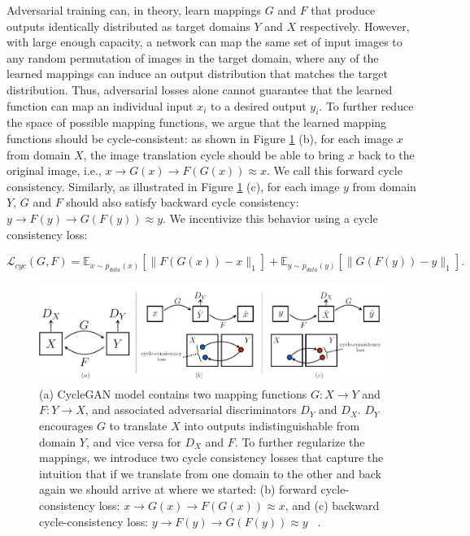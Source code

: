 Adversarial training can, in theory, learn mappings $G$ and $F$ that produce outputs identically distributed as target domains $Y$ and $X$ respectively. However, with large enough capacity, a network can map the same set of input images to any random permutation of images in the target domain, where any of the learned mappings can induce an output distribution that matches the target distribution. Thus, adversarial losses alone cannot guarantee that the learned function can map an individual input $x_i$ to a desired output $y_i$. To further reduce the space of possible mapping functions, we argue that the learned mapping functions should be cycle-consistent: as shown in Figure \ref{fig:CycleGAN} (b), for each image $x$ from domain $X$, the image translation cycle should be able to bring $x$ back to the original image, i.e., $x \rightarrow G(x) \rightarrow F(G(x)) \approx x$. We call this forward cycle consistency. Similarly, as illustrated in Figure \ref{fig:CycleGAN} (c), for each image $y$ from domain $Y$, $G$ and $F$ should also satisfy backward cycle consistency: $y \rightarrow F(y) \rightarrow G(F(y)) \approx y$. We incentivize this behavior using a cycle consistency loss: 

\begin{equation}\label{CycleConsistencyLossEquation}
    \mathcal{L}_{cyc}(G, F) = \mathbb{E}_{x \sim p_{data}(x)}[\|F(G(x)) - x\|_1] + \mathbb{E}_{y \sim p_{data}(y)}[\|G(F(y)) - y\|_1].
    \end{equation}

\begin{figure}[H]
	    \begin{center} \includegraphics[scale=0.5]{images/CycleGAN.jpg}
	    \caption[CycleGAN Model Mapping Functions.]{(a) CycleGAN model contains two mapping functions $G : X \rightarrow Y$ and $F : Y \rightarrow X$, and associated adversarial discriminators $D_Y$ and $D_X$. $D_Y$ encourages $G$ to translate $X$ into outputs indistinguishable from domain $Y$, and vice versa for $D_X$ and $F$. To further regularize the mappings, we introduce two cycle consistency losses that capture the intuition that if we translate from one domain to the other and back again we should arrive at where we started: (b) forward cycle-consistency loss: $x \rightarrow G(x) \rightarrow F(G(x)) \approx x$, and (c) backward cycle-consistency loss: $y \rightarrow F(y) \rightarrow G(F(y)) \approx y$ ~\cite{zhu2020unpaired}.}
	    \label{fig:CycleGAN}
	    \end{center}
\end{figure}

